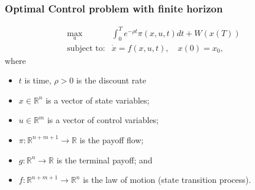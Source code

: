 \documentclass[bigger,handout]{beamer}
\newenvironment{stepitemize}{\begin{itemize}[<+->]}{\end{itemize} }
\begin{document}
 
 
\begin{frame}%
 
\frametitle{Optimal Control problem with finite horizon}

\begin{equation*}
\begin{array}{rc}
\max_{u} & \int_{0}^{T}e^{-\rho t}\pi (x,u,t)dt+W(x(T)) \\ 
\text{subject to:} & \dot{x}=f(x,u,t),\quad x(0)=x_{0},%
\end{array}%
\end{equation*}%
where

\begin{stepitemize}
\item $t$ is time, $\rho >0$ is the discount rate

\item $x\in \mathbb{R}^{n}$ is a vector of state variables;

\item $u\in \mathbb{R}^{m}$ is a vector of control variables;

\item $\pi :\mathbb{R}^{n+m+1}\rightarrow \mathbb{R}$ is the payoff flow;

\item $g:\mathbb{R}^{n}\rightarrow \mathbb{R}$ is the terminal payoff; and

\item $f:\mathbb{R}^{n+m+1}\rightarrow \mathbb{R}^{n}$ is the law of motion 
\newline
(state transition process).
\end{stepitemize}

 
 
\end{frame}%
 
 
 
\end{document}
